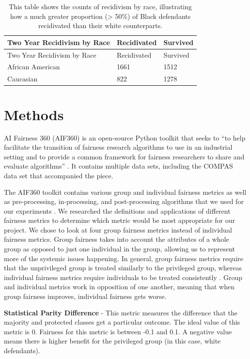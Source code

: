 \documentclass[water,article,submit,moreauthors,pdftex]{mdpi}
\begin{document}
\begin{longtable}[]{@{}lll@{}}
\caption{This table shows the counts of recidivism by race, illustrating
how a much greater proportion (\textgreater{} 50\%) of Black defendants
recidivated than their white counterparts.
\label{tab:recid table}}\tabularnewline
\toprule
Two Year Recidivism by Race & Recidivated & Survived\tabularnewline
\midrule
\endfirsthead
\toprule
Two Year Recidivism by Race & Recidivated & Survived\tabularnewline
\midrule
\endhead
African American & 1661 & 1512\tabularnewline
Caucasian & 822 & 1278\tabularnewline
\bottomrule
\end{longtable}

\hypertarget{methods}{%
\section{Methods}\label{methods}}

AI Fairness 360 (AIF360) is an open-source Python toolkit that seeks to
``to help facilitate the transition of fairness research algorithms to
use in an industrial setting and to provide a common framework for
fairness researchers to share and evaluate algorithms''
\citep{aif360-oct-2018}. It contains multiple data sets, including the
COMPAS data set that accompanied the \citet{angwin2016machine} piece.

The AIF360 toolkit contains various group and individual fairness
metrics as well as pre-processing, in-processing, and post-processing
algorithms that we used for our experiments \citep{aif360-oct-2018}. We
researched the definitions and applications of different fairness
metrics \citep{ashokan2021fairness} to determine which metric would be
most appropriate for our project. We chose to look at four group
fairness metrics instead of individual fairness metrics. Group fairness
takes into account the attributes of a whole group as opposed to just
one individual in the group, allowing us to represent more of the
systemic issues happening. In general, group fairness metrics require
that the unprivileged group is treated similarly to the privileged
group, whereas individual fairness metrics require individuals to be
treated consistently \citep{kypraiou_what_2021}. Group and individual
metrics work in opposition of one another, meaning that when group
fairness improves, individual fairness gets worse.

\textbf{Statistical Parity Difference} - This metric measures the
difference that the majority and protected classes get a particular
outcome. The ideal value of this metric is 0. Fairness for this metric
is between -0.1 and 0.1. A negative value means there is higher benefit
for the privileged group (in this case, white defendants).
\end{document}
